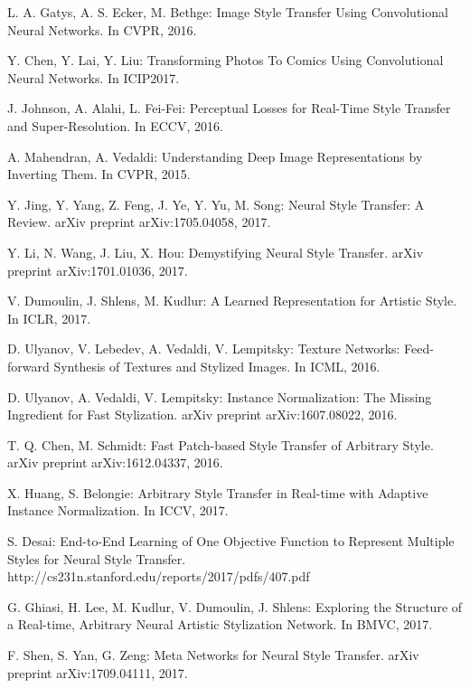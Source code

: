 \documentclass{llncs}
\begin{document}
\begin{thebibliography}{5}
L. A. Gatys, A. S. Ecker, M. Bethge:
Image Style Transfer Using Convolutional Neural Networks.
In CVPR, 2016.

Y. Chen, Y. Lai, Y. Liu:
Transforming Photos To Comics Using Convolutional Neural Networks.
In ICIP2017.

J. Johnson, A. Alahi, L. Fei-Fei:
Perceptual Losses for Real-Time Style Transfer and Super-Resolution.
In ECCV, 2016.

A. Mahendran, A. Vedaldi:
Understanding Deep Image Representations by Inverting Them.
In CVPR, 2015.

Y. Jing, Y. Yang, Z. Feng, J. Ye, Y. Yu, M. Song:
Neural Style Transfer: A Review.
arXiv preprint arXiv:1705.04058, 2017.

Y. Li, N. Wang, J. Liu, X. Hou:
Demystifying Neural Style Transfer.
arXiv preprint arXiv:1701.01036, 2017.

V. Dumoulin, J. Shlens, M. Kudlur:
A Learned Representation for Artistic Style.
In ICLR, 2017.

D. Ulyanov, V. Lebedev, A. Vedaldi, V. Lempitsky:
Texture Networks: Feed-forward Synthesis of Textures and Stylized Images.
In ICML, 2016.

D. Ulyanov, A. Vedaldi, V. Lempitsky:
Instance Normalization: The Missing Ingredient for Fast
Stylization.
arXiv preprint arXiv:1607.08022, 2016.

T. Q. Chen, M. Schmidt:
Fast Patch-based Style Transfer of Arbitrary Style.
arXiv preprint arXiv:1612.04337, 2016.

X. Huang, S. Belongie:
Arbitrary Style Transfer in Real-time with Adaptive Instance Normalization.
In ICCV, 2017.

S. Desai:
End-to-End Learning of One Objective Function to Represent Multiple Styles for Neural Style Transfer.
http://cs231n.stanford.edu/reports/2017/pdfs/407.pdf

G. Ghiasi, H. Lee, M. Kudlur, V. Dumoulin, J. Shlens:
Exploring the Structure of a Real-time, Arbitrary Neural Artistic Stylization Network.
In BMVC, 2017.

F. Shen, S. Yan, G. Zeng:
Meta Networks for Neural Style Transfer.
arXiv preprint arXiv:1709.04111, 2017.


\end{thebibliography}
\end{document}
